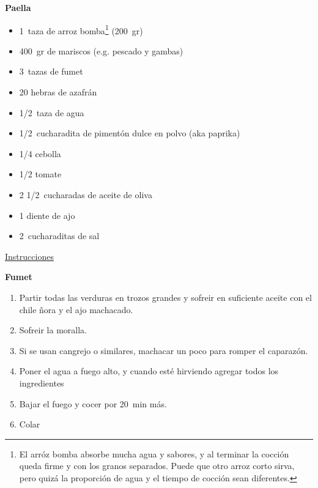 \textbf{Paella}
\begin{itemize}
\item \SI{1}{taza} de arroz bomba\footnote{El arróz bomba absorbe mucha agua y sabores, y al terminar la cocción queda firme y con los granos separados. Puede que otro arroz corto sirva, pero quizá la proporción de agua y el tiempo de cocción sean diferentes.} (\SI{200}{gr})
\item \SI{400}{gr} de mariscos (e.g. pescado y gambas)
\item \SI{3}{tazas} de fumet
\item 20 hebras de azafrán
\item \SI{1/2}{taza} de agua
\item \SI{1/2}{cucharadita} de pimentón dulce en polvo (aka paprika)
\item \num{1/4} cebolla
\item \num{1/2} tomate
\item 2 \SI{1/2}{cucharadas} de aceite de oliva
\item 1 diente de ajo
\item \SI{2}{cucharaditas} de sal
\end{itemize}

\underline{Instrucciones}

\textbf{Fumet}
\begin{enumerate}
\item Partir todas las verduras en trozos grandes y sofreir en suficiente aceite con el chile ñora y el ajo machacado.
\item Sofreir la moralla.
\item Si se usan cangrejo o similares, machacar un poco para romper el caparazón.
\item Poner el agua a fuego alto, y cuando esté hirviendo agregar todos los ingredientes
\item Bajar el fuego y cocer por \SI{20}{min} más.
\item Colar
\end{enumerate}

